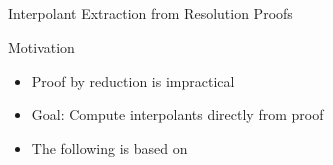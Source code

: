 \documentclass[final,compress]{beamer}
\begin{document}
\subsection{}
\begin{frame}{Interpolant Extraction from Resolution Proofs}
	\begin{block}{Motivation}
		\begin{itemize}
			\item Proof by reduction is impractical
			\item Goal: Compute interpolants directly from proof
			\item The following is based on \cite{Huang95}
		\end{itemize}
	\end{block}
\end{frame}

\end{document}
